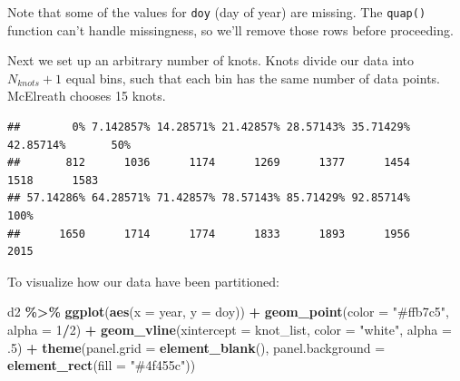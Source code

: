 \documentclass[
]{book}
\newenvironment{Shaded}{\begin{snugshade}}{\end{snugshade}}
\newcommand{\AttributeTok}[1]{\textcolor[rgb]{0.13,0.29,0.53}{#1}}
\newcommand{\CommentTok}[1]{\textcolor[rgb]{0.56,0.35,0.01}{\textit{#1}}}
\newcommand{\DecValTok}[1]{\textcolor[rgb]{0.00,0.00,0.81}{#1}}
\newcommand{\FunctionTok}[1]{\textcolor[rgb]{0.13,0.29,0.53}{\textbf{#1}}}
\newcommand{\NormalTok}[1]{#1}
\newcommand{\OtherTok}[1]{\textcolor[rgb]{0.56,0.35,0.01}{#1}}
\newcommand{\SpecialCharTok}[1]{\textcolor[rgb]{0.81,0.36,0.00}{\textbf{#1}}}
\newcommand{\StringTok}[1]{\textcolor[rgb]{0.31,0.60,0.02}{#1}}
\begin{document}
Note that some of the values for \texttt{doy} (day of year) are missing. The \texttt{quap()} function can't handle missingness, so we'll remove those rows before proceeding.

\begin{Shaded}
\end{Shaded}

Next we set up an arbitrary number of knots. Knots divide our data into \(N_{knots}+1\) equal bins, such that each bin has the same number of data points. McElreath chooses 15 knots.

\begin{Shaded}
\end{Shaded}

\begin{verbatim}
##        0% 7.142857% 14.28571% 21.42857% 28.57143% 35.71429% 42.85714%       50% 
##       812      1036      1174      1269      1377      1454      1518      1583 
## 57.14286% 64.28571% 71.42857% 78.57143% 85.71429% 92.85714%      100% 
##      1650      1714      1774      1833      1893      1956      2015
\end{verbatim}

To visualize how our data have been partitioned:

\begin{Shaded}
\begin{Highlighting}[]
\NormalTok{d2 }\SpecialCharTok{\%\textgreater{}\%} 
  \FunctionTok{ggplot}\NormalTok{(}\FunctionTok{aes}\NormalTok{(}\AttributeTok{x =}\NormalTok{ year, }\AttributeTok{y =}\NormalTok{ doy)) }\SpecialCharTok{+}
  \FunctionTok{geom\_point}\NormalTok{(}\AttributeTok{color =} \StringTok{"\#ffb7c5"}\NormalTok{, }\AttributeTok{alpha =} \DecValTok{1}\SpecialCharTok{/}\DecValTok{2}\NormalTok{) }\SpecialCharTok{+} 
  \FunctionTok{geom\_vline}\NormalTok{(}\AttributeTok{xintercept =}\NormalTok{ knot\_list, }\AttributeTok{color =} \StringTok{"white"}\NormalTok{, }\AttributeTok{alpha =}\NormalTok{ .}\DecValTok{5}\NormalTok{) }\SpecialCharTok{+}
  \FunctionTok{theme}\NormalTok{(}\AttributeTok{panel.grid =} \FunctionTok{element\_blank}\NormalTok{(),}
        \AttributeTok{panel.background =} \FunctionTok{element\_rect}\NormalTok{(}\AttributeTok{fill =} \StringTok{"\#4f455c"}\NormalTok{))}
\end{Highlighting}
\end{Shaded}
\end{document}
